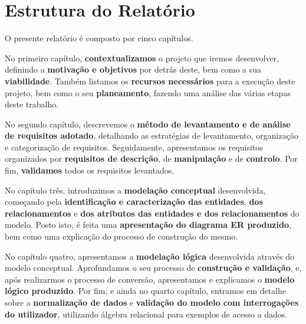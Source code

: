 \documentclass[a4paper,12pt]{scrreprt}
\begin{document}

    \clearpage
    
    \section{Estrutura do Relatório}
    O presente relatório é composto por cinco capítulos.
    
    No primeiro capítulo, \textbf{contextualizamos} o projeto que iremos desenvolver, definindo a \textbf{motivação e objetivos} por detrás deste, bem como a sua \textbf{viabilidade}. Também listamos os \textbf{recursos necessários} para a execução deste projeto, bem como o seu \textbf{planeamento}, fazendo uma análise das várias etapas deste trabalho.

    No segundo capítulo, descrevemos o \textbf{método de levantamento e de análise de requisitos adotado}, detalhando as estratégias de levantamento, organização e categorização de requisitos. Seguidamente, apresentamos os requisitos organizados por \textbf{requisitos de descrição}, de \textbf{manipulação} e de \textbf{controlo}. Por fim, \textbf{validamos} todos os requisitos levantados.

    No capítulo três, introduzimos a \textbf{modelação conceptual} desenvolvida, começando pela \textbf{identificação e caracterização das entidades}, \textbf{dos relacionamentos} e \textbf{dos atributos das entidades e dos relacionamentos} do modelo. Posto isto, é feita uma \textbf{apresentação do diagrama ER produzido}, bem como uma explicação do processo de construção do mesmo.

    No capítulo quatro, apresentamos a \textbf{modelação lógica} desenvolvida através do modelo conceptual. Aprofundamos o seu processo de \textbf{construção e validação}, e, após realizarmos o processo de conversão, apresentamos e explicamos o \textbf{modelo lógico produzido}.
    Por fim, e ainda no quarto capítulo, entramos em detalhe sobre a \textbf{normalização de dados} e \textbf{validação do modelo com interrogações do utilizador}, utilizando álgebra relacional para exemplos de acesso a dados.
\end{document}
